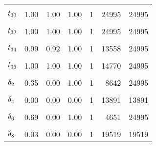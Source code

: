 \begin{longtable}[t]{lrrrrrr}
\cellcolor{gray!6}{$t_{29}$} & \cellcolor{gray!6}{0.99} & \cellcolor{gray!6}{0.93} & \cellcolor{gray!6}{1.00} & \cellcolor{gray!6}{1} & \cellcolor{gray!6}{15196} & \cellcolor{gray!6}{24995}\\
$t_{30}$ & 1.00 & 1.00 & 1.00 & 1 & 24995 & 24995\\
\cellcolor{gray!6}{$t_{31}$} & \cellcolor{gray!6}{0.88} & \cellcolor{gray!6}{0.66} & \cellcolor{gray!6}{1.00} & \cellcolor{gray!6}{1} & \cellcolor{gray!6}{3341} & \cellcolor{gray!6}{24995}\\
$t_{32}$ & 1.00 & 1.00 & 1.00 & 1 & 24995 & 24995\\
\cellcolor{gray!6}{$t_{33}$} & \cellcolor{gray!6}{1.00} & \cellcolor{gray!6}{1.00} & \cellcolor{gray!6}{1.00} & \cellcolor{gray!6}{1} & \cellcolor{gray!6}{21894} & \cellcolor{gray!6}{24995}\\
$t_{34}$ & 0.99 & 0.92 & 1.00 & 1 & 13558 & 24995\\
\cellcolor{gray!6}{$t_{35}$} & \cellcolor{gray!6}{1.00} & \cellcolor{gray!6}{1.00} & \cellcolor{gray!6}{1.00} & \cellcolor{gray!6}{1} & \cellcolor{gray!6}{24995} & \cellcolor{gray!6}{24995}\\
$t_{36}$ & 1.00 & 1.00 & 1.00 & 1 & 14770 & 24995\\
\cellcolor{gray!6}{$\delta_{1}$} & \cellcolor{gray!6}{0.00} & \cellcolor{gray!6}{0.00} & \cellcolor{gray!6}{0.00} & \cellcolor{gray!6}{1} & \cellcolor{gray!6}{25010} & \cellcolor{gray!6}{25010}\\
$\delta_{2}$ & 0.35 & 0.00 & 1.00 & 1 & 8642 & 24995\\
\cellcolor{gray!6}{$\delta_{3}$} & \cellcolor{gray!6}{0.15} & \cellcolor{gray!6}{0.00} & \cellcolor{gray!6}{1.00} & \cellcolor{gray!6}{1} & \cellcolor{gray!6}{9952} & \cellcolor{gray!6}{24995}\\
$\delta_{4}$ & 0.00 & 0.00 & 0.00 & 1 & 13891 & 13891\\
\cellcolor{gray!6}{$\delta_{5}$} & \cellcolor{gray!6}{0.00} & \cellcolor{gray!6}{0.00} & \cellcolor{gray!6}{0.00} & \cellcolor{gray!6}{1} & \cellcolor{gray!6}{24995} & \cellcolor{gray!6}{24995}\\
$\delta_{6}$ & 0.69 & 0.00 & 1.00 & 1 & 4651 & 24995\\
\cellcolor{gray!6}{$\delta_{7}$} & \cellcolor{gray!6}{0.06} & \cellcolor{gray!6}{0.00} & \cellcolor{gray!6}{1.00} & \cellcolor{gray!6}{1} & \cellcolor{gray!6}{15574} & \cellcolor{gray!6}{24995}\\
$\delta_{8}$ & 0.03 & 0.00 & 0.00 & 1 & 19519 & 19519\\

\end{longtable}
